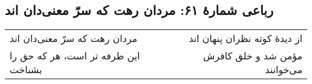 \begin{center}
\section*{رباعی شمارهٔ ۶۱: مردان رهت که سرّ معنی‌دان اند}
\label{sec:061}
\begin{longtable}{l p{0.5cm} r}
مردان رهت که سرّ معنی‌دان اند
&&
از دیدهٔ کوته نظران پنهان اند
\\
این طرفه تر است، هر که حق را بشناخت
&&
مؤمن شد و خلق کافرش می‌خوانند
\\
\end{longtable}
\end{center}
